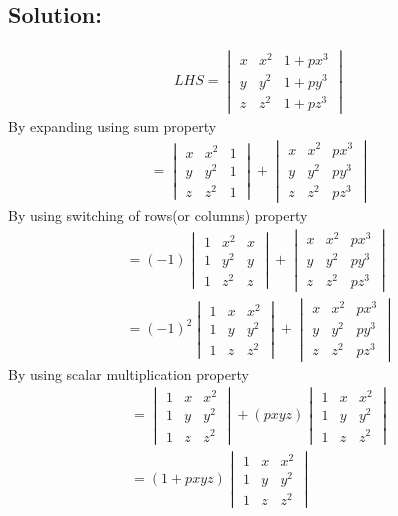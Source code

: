 \documentclass[journal,12pt,twocolumn]{IEEEtran}
\begin{document}
\subsection*{Solution:}
\begin{align}
LHS=\begin{vmatrix}
x&x^2&1+px^3\\y&y^2&1+py^3\\z&z^2&1+pz^3
\end{vmatrix}
\end{align}
By expanding using sum property
\begin{align}
=\begin{vmatrix}
x&x^2&1\\y&y^2&1\\z&z^2&1
\end{vmatrix}
+\begin{vmatrix}
x&x^2&px^3\\y&y^2&py^3\\z&z^2&pz^3
\end{vmatrix}
\end{align}
By using switching of rows(or columns) property
\begin{align}
=(-1)\begin{vmatrix}
1&x^2&x\\1&y^2&y\\1&z^2&z
\end{vmatrix}
+\begin{vmatrix}
x&x^2&px^3\\y&y^2&py^3\\z&z^2&pz^3
\end{vmatrix}\\
=(-1)^2\begin{vmatrix}
1&x&x^2\\1&y&y^2\\1&z&z^2
\end{vmatrix}
+\begin{vmatrix}
x&x^2&px^3\\y&y^2&py^3\\z&z^2&pz^3
\end{vmatrix}
\end{align}
By using scalar multiplication property
\begin{align}
=\begin{vmatrix}
1&x&x^2\\1&y&y^2\\1&z&z^2
\end{vmatrix}
+(pxyz)\begin{vmatrix}
1&x&x^2\\1&y&y^2\\1&z&z^2
\end{vmatrix}\\
=(1+pxyz)\begin{vmatrix}
1&x&x^2\\1&y&y^2\\1&z&z^2
\end{vmatrix}
\end{align}
\end{document}
